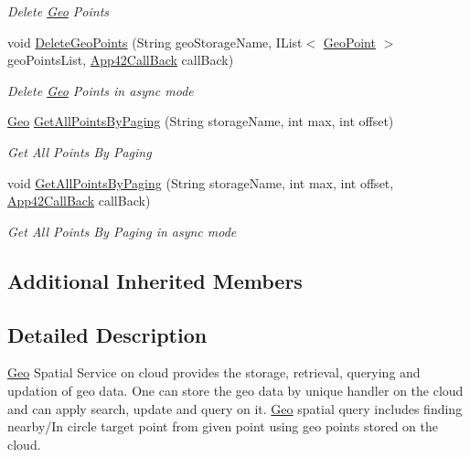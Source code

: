 \begin{DoxyCompactItemize}
\begin{DoxyCompactList}\small\item\em Delete \hyperlink{classcom_1_1shephertz_1_1app42_1_1paas_1_1sdk_1_1csharp_1_1geo_1_1_geo}{Geo} Points \end{DoxyCompactList}\item 
void \hyperlink{classcom_1_1shephertz_1_1app42_1_1paas_1_1sdk_1_1csharp_1_1geo_1_1_geo_service_ae7f5a8bc3981704036870f0543d24dc9}{Delete\+Geo\+Points} (String geo\+Storage\+Name, I\+List$<$ \hyperlink{classcom_1_1shephertz_1_1app42_1_1paas_1_1sdk_1_1csharp_1_1geo_1_1_geo_point}{Geo\+Point} $>$ geo\+Points\+List, \hyperlink{interfacecom_1_1shephertz_1_1app42_1_1paas_1_1sdk_1_1csharp_1_1_app42_call_back}{App42\+Call\+Back} call\+Back)
\begin{DoxyCompactList}\small\item\em Delete \hyperlink{classcom_1_1shephertz_1_1app42_1_1paas_1_1sdk_1_1csharp_1_1geo_1_1_geo}{Geo} Points in async mode \end{DoxyCompactList}\item 
\hyperlink{classcom_1_1shephertz_1_1app42_1_1paas_1_1sdk_1_1csharp_1_1geo_1_1_geo}{Geo} \hyperlink{classcom_1_1shephertz_1_1app42_1_1paas_1_1sdk_1_1csharp_1_1geo_1_1_geo_service_a544689ee5a4c35e4b6b7774fff07a114}{Get\+All\+Points\+By\+Paging} (String storage\+Name, int max, int offset)
\begin{DoxyCompactList}\small\item\em Get All Points By Paging \end{DoxyCompactList}\item 
void \hyperlink{classcom_1_1shephertz_1_1app42_1_1paas_1_1sdk_1_1csharp_1_1geo_1_1_geo_service_a2d6ee76570bf5130462ad696c92ba34b}{Get\+All\+Points\+By\+Paging} (String storage\+Name, int max, int offset, \hyperlink{interfacecom_1_1shephertz_1_1app42_1_1paas_1_1sdk_1_1csharp_1_1_app42_call_back}{App42\+Call\+Back} call\+Back)
\begin{DoxyCompactList}\small\item\em Get All Points By Paging in async mode \end{DoxyCompactList}\end{DoxyCompactItemize}
\subsection*{Additional Inherited Members}


\subsection{Detailed Description}
\hyperlink{classcom_1_1shephertz_1_1app42_1_1paas_1_1sdk_1_1csharp_1_1geo_1_1_geo}{Geo} Spatial Service on cloud provides the storage, retrieval, querying and updation of geo data. One can store the geo data by unique handler on the cloud and can apply search, update and query on it. \hyperlink{classcom_1_1shephertz_1_1app42_1_1paas_1_1sdk_1_1csharp_1_1geo_1_1_geo}{Geo} spatial query includes finding nearby/\+In circle target point from given point using geo points stored on the cloud. 

